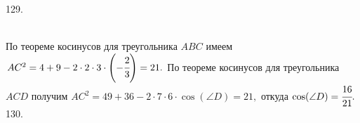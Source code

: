 \documentclass[12pt]{article}
\begin{document}
129. \begin{figure}[ht!]
\end{figure}\\
По теореме косинусов для треугольника $ABC$ имеем $AC^2=4+9-2\cdot2\cdot3\cdot\left(-\cfrac{2}{3}\right)=21.$ По теореме косинусов для треугольника $ACD$ получим $AC^2=49+36-2\cdot7\cdot6\cdot \cos(\angle D)=21,$ откуда $\cos(\angle D)=\cfrac{16}{21}.$\\
130. \begin{figure}[ht!]
\end{figure}\\
\end{document}

